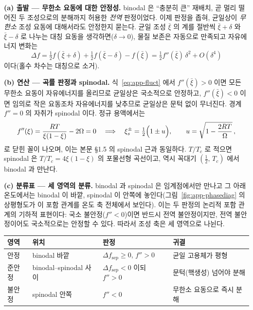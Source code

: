 \documentclass[11pt,a4paper]{article}
\begin{document}
\textbf{(a) 출발 --- 무한소 요동에 대한 안정성.} binodal 은 ``충분히 큰'' 재배치, 곧 멀리 떨어진 두
조성으로의 분해까지 허용한 \emph{전역} 판정이었다. 이제 판정을 좁혀, 균일상이 \emph{무한소} 조성
요동에 대해서라도 안정한지 묻는다. 균일 조성 $\bar\xi$ 의 계를 절반씩 $\bar\xi+\delta$ 와
$\bar\xi-\delta$ 로 나누는 대칭 요동을 생각하면($\delta\to0$), 물질 보존은 자동으로 만족되고
자유에너지 변화는
\begin{equation}
\Delta f=\tfrac12 f(\bar\xi+\delta)+\tfrac12 f(\bar\xi-\delta)-f(\bar\xi)
=\tfrac12 f''(\bar\xi)\,\delta^2+O(\delta^4)
\label{eq:app-fluct}
\end{equation}
이다(홀수 차수는 대칭으로 소거).

\textbf{(b) 연산 --- 곡률 판정과 spinodal.} 식~\eqref{eq:app-fluct} 에서 $f''(\bar\xi)>0$ 이면 모든
무한소 요동이 자유에너지를 올리므로 균일상은 국소적으로 안정하고, $f''(\bar\xi)<0$ 이면 임의로 작은
요동조차 자유에너지를 낮추므로 균일상은 문턱 없이 무너진다. 경계 $f''=0$ 의 자취가 spinodal 이다.
정규 용액에서는
\begin{equation}
f''(\xi)=\frac{RT}{\xi(1-\xi)}-2\Omega=0
\quad\Longrightarrow\quad
\xi_s^\pm=\tfrac12\Bigl(1\pm u\Bigr),\qquad u=\sqrt{1-\frac{2RT}{\Omega}}\,,
\label{eq:app-spinodal}
\end{equation}
로 닫힌 꼴이 나오며, 이는 본문 \S1.5 의 spinodal 근과 동일하다. $T/T_c$ 로 적으면 spinodal 은
$T/T_c=4\xi(1-\xi)$ 의 포물선형 곡선이고, 역시 꼭대기 $(\tfrac12,\,T_c)$ 에서 binodal 과 만난다.

\textbf{(c) 분류표 --- 세 영역의 분류.} binodal 과 spinodal 은 임계점에서만 만나고 그 아래 온도에서는
binodal 이 바깥, spinodal 이 안쪽에 놓인다(그림~\ref{fig:app-phasediag} 의 상평형도가 이 포함 관계를
온도 축 전체에서 보인다). 이는 두 판정의 논리적 포함 관계의 기하적 표현이다:
국소 불안정($f''<0$)이면 반드시 전역 불안정이지만, 전역 불안정이어도 국소적으로는 안정할 수 있다.
따라서 조성 축은 세 영역으로 나뉜다.
\begin{center}
\begin{tabular}{@{}llll@{}}
\toprule
영역 & 위치 & 판정 & 귀결 \\
\midrule
안정 & binodal 바깥 & $\Delta f_\mathrm{sep}\ge0$, $f''>0$ & 균일 고용체가 평형 \\
준안정 & binodal--spinodal 사이 & $\Delta f_\mathrm{sep}<0$ 이되 $f''>0$ & 문턱(핵생성) 넘어야 분해 \\
불안정 & spinodal 안쪽 & $f''<0$ & 무한소 요동으로 즉시 분해 \\
\bottomrule
\end{tabular}
\end{center}
\end{document}
